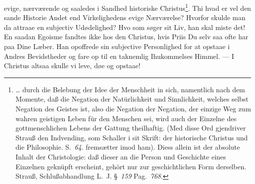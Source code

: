 \documentclass[12pt]{book}
\newcommand{\opage}[1]{\marginnote{\footnotesize\textit{[#1]}}}
\begin{document}
evige, nærværende og saaledes i Sandhed historiske Christus\footnote{\ldots{}
durch die Belebung der Idee der Menschheit in sich, namentlich nach dem Momente,
daß die Negation der Natürlichkeit und Sinnlichkeit, welches selbst Negation des
Geistes ist, also die Negation der Negation, der einzige Weg zum wahren
geistigen Leben für den Menschen sei, wird auch der Einzelne des
gottmenschlichen Lebens der Gattung theilhaftig. (Med disse Ord gjendriver
Strauß den Indvending, som Schaller i sit Skrift: der historische Christus und
die Philosophie. S.~\textit{64}. fremsætter imod ham). Diess allein ist der
absolute Inhalt der Christologie: daß dieser an die Person und Geschichte eines
Einzelnen geknüpft erscheint, gehört nur zur geschichtlichen Form derselben.
Strauß, Schlußabhandlung L.~J. §~\textit{159} Pag.~\textit{768}.}. Thi hvad er
vel den sande
\opage{138} Historie Andet end Virkelighedens evige Nærværelse? Hvorfor skulde man da
attraae en subjectiv Udødelighed? Hvo som søger sit Liv, han skal miste det! En
saadan Egoisme fandtes ikke hos den Christus, hvis Priis Du selv saa ofte har
paa Dine Læber. Han opoffrede sin subjective Personlighed for at opstaae i
Andres Bevidstheder og fare op til en taknemlig Ihukommelses Himmel. --- I
Christus altsaa skulle vi leve, døe og opstaae!
\end{document}
